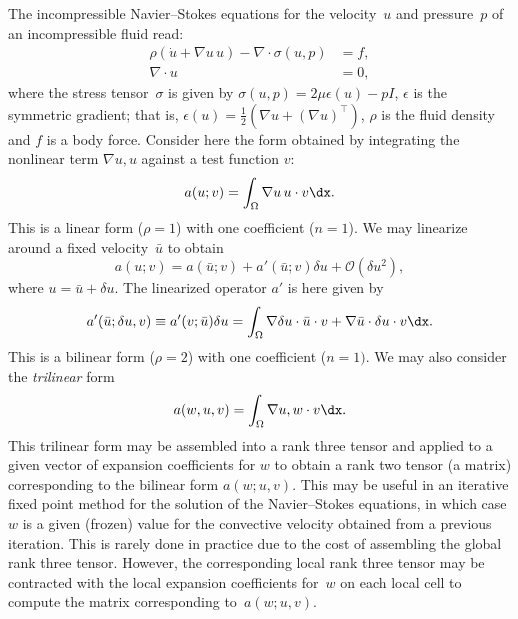 The incompressible Navier--Stokes equations for the velocity~$u$ and
pressure~$p$ of an incompressible fluid read:
\begin{equation}
  \begin{split}
    \rho(\dot{u} + \nabla u \, u) - \nabla \cdot \sigma(u, p) &= f, \\
    \nabla \cdot u &= 0,
  \end{split}
\end{equation}
where the stress tensor~$\sigma$ is given by $\sigma(u, p) = 2 \mu
\epsilon(u) - p I$, $\epsilon$ is the symmetric gradient; that is,
$\epsilon(u) = \frac{1}{2}(\nabla u + (\nabla u)^{\top})$, $\rho$ is
the fluid density and $f$ is a body force.
Consider here the form obtained by
integrating the nonlinear term $\nabla u , u$ against a test
function $v$:
\begin{equation}
  a(u; v) = \int_{\Omega} \nabla u \, u \cdot v \dx.
\end{equation}
This is a linear form ($\rho = 1$) with one coefficient ($n = 1$). We
may linearize around a fixed velocity~$\bar{u}$ to obtain
\begin{equation}
  a(u; v) = a(\bar{u}; v) + a'(\bar{u}; v) \delta u + \mathcal{O}(\delta u^2),
\end{equation}
where $u = \bar{u} + \delta u$. The linearized operator $a'$ is here
given by
\begin{equation}
  a'(\bar{u}; \delta u, v) \equiv a'(v; \bar{u}) \delta u =
  \int_{\Omega}
  \nabla \delta u \cdot \bar{u} \cdot v +
  \nabla \bar{u} \cdot \delta u \cdot v \dx.
\end{equation}
This is a bilinear form ($\rho = 2$) with one coefficient ($n = 1)$.
We may also consider the \emph{trilinear} form
\begin{equation}
  a(w, u, v) = \int_{\Omega} \nabla u , w \cdot v \dx.
\end{equation}
This trilinear form may be assembled into a rank three tensor and
applied to a given vector of expansion coefficients for $w$ to obtain
a rank two tensor (a matrix) corresponding to the bilinear form $a(w;
u, v)$. This may be useful in an iterative fixed point method for the
solution of the Navier--Stokes equations, in which case $w$ is a given
(frozen) value for the convective velocity obtained from a previous
iteration. This is rarely done in practice due to the cost of
assembling the global rank three tensor. However, the corresponding
local rank three tensor may be contracted with the local expansion
coefficients for~$w$ on each local cell to compute the matrix
corresponding to~$a(w; u, v)$.

